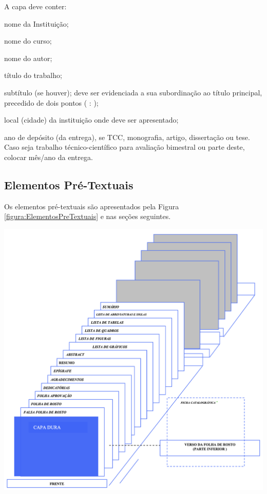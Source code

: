 \documentclass[a4paper,12pt]{article}  %
\begin{document}
\begin{ElementosTextuais}
\begin{Desenvolvimento}
A capa deve conter:
\begin{alphaitemize}
  \item nome da Instituição;
  \item nome do curso;
  \item nome do autor;
  \item título do trabalho;
  \item subtítulo (se houver); deve ser evidenciada a sua subordinação ao título principal, precedido de dois pontos ( : );
  \item local (cidade) da instituição onde deve ser apresentado;
  \item ano de depósito (da entrega), se TCC, monografia, artigo, dissertação ou tese. Caso seja trabalho técnico-científico para avaliação bimestral ou parte deste, colocar mês/ano da entrega.
\end{alphaitemize}

\subsection{Elementos Pré-Textuais}
Os elementos pré-textuais são apresentados pela Figura \ref{figura:ElementosPreTextuais} e nas seções seguintes.

\begin{figura}[h!]
  \centering
  \addfigura
  \includegraphics[width=1\textwidth]{ilustracoes/figuras/Elementos Pre Textuais.png}
  \label{figura:ElementosPreTextuais}
\end{figura}


\end{Desenvolvimento}
\end{ElementosTextuais}
\end{document}
